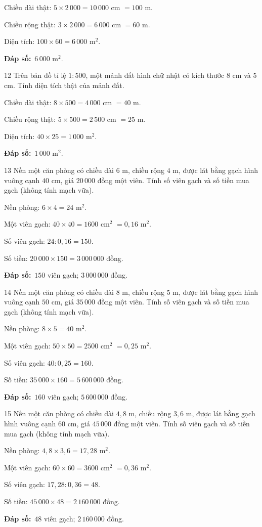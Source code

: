 \documentclass[11pt]{article}
\newif\ifsol \solfalse
\providecommand{\AnsWord}{Đáp số}
\newcommand{\dapso}[1]{\par\textbf{\AnsWord:}\ #1}
\newcommand{\probsol}[1]{%
  \begin{lrbox}{\solmeasure}\begin{minipage}{\dimexpr\linewidth-24pt\relax}#1\end{minipage}\end{lrbox}%
  \ifsol
    \begin{solbox}#1\end{solbox}%
  \else
    \setlength{\solht}{\dimexpr\ht\solmeasure+\dp\solmeasure+0.85cm\relax}%
    \ifdim\solht<1.35cm\setlength{\solht}{1.35cm}\fi
    \begin{tcolorbox}[colback=white,colframe=Line,boxrule=0.8pt,arc=5pt,
      left=8pt,right=8pt,top=4pt,bottom=4pt,height=\solht]{\footnotesize\color{Slate}\itshape\WorkWord}\end{tcolorbox}%
  \fi}
\newcommand{\gap}{\vspace{0.3cm}}
\def\WorkWord{Bài làm:}
\def\AnsWord{Đáp số}
\begin{document}
\probsol{
Chiều dài thật: $5\times2\,000=10\,000$ cm $=100$ m.\par Chiều rộng thật: $3\times2\,000=6\,000$ cm $=60$ m.\par Diện tích: $100\times60=6\,000$ m$^2$.
\dapso{$6\,000$ m$^2$.}}
\gap
\begin{probbox}{12}{\relax}
Trên bản đồ tỉ lệ $1:500$, một mảnh đất hình chữ nhật có kích thước $8$ cm và $5$ cm. Tính diện tích thật của mảnh đất.
\end{probbox}
\probsol{
Chiều dài thật: $8\times500=4\,000$ cm $=40$ m.\par Chiều rộng thật: $5\times500=2\,500$ cm $=25$ m.\par Diện tích: $40\times25=1\,000$ m$^2$.
\dapso{$1\,000$ m$^2$.}}
\gap
\begin{probbox}{13}{\relax}
Nền một căn phòng có chiều dài $6$ m, chiều rộng $4$ m, được lát bằng gạch hình vuông cạnh $40$ cm, giá $20\,000$ đồng một viên. Tính số viên gạch và số tiền mua gạch (không tính mạch vữa).
\end{probbox}
\probsol{
Nền phòng: $6\times4=24$ m$^2$.\par Một viên gạch: $40\times40=1600$ cm$^2$ $=0{,}16$ m$^2$.\par Số viên gạch: $24:0{,}16=150$.\par Số tiền: $20\,000\times150=3\,000\,000$ đồng.
\dapso{$150$ viên gạch; $3\,000\,000$ đồng.}}
\gap
\begin{probbox}{14}{\relax}
Nền một căn phòng có chiều dài $8$ m, chiều rộng $5$ m, được lát bằng gạch hình vuông cạnh $50$ cm, giá $35\,000$ đồng một viên. Tính số viên gạch và số tiền mua gạch (không tính mạch vữa).
\end{probbox}
\probsol{
Nền phòng: $8\times5=40$ m$^2$.\par Một viên gạch: $50\times50=2500$ cm$^2$ $=0{,}25$ m$^2$.\par Số viên gạch: $40:0{,}25=160$.\par Số tiền: $35\,000\times160=5\,600\,000$ đồng.
\dapso{$160$ viên gạch; $5\,600\,000$ đồng.}}
\gap
\begin{probbox}{15}{\relax}
Nền một căn phòng có chiều dài $4{,}8$ m, chiều rộng $3{,}6$ m, được lát bằng gạch hình vuông cạnh $60$ cm, giá $45\,000$ đồng một viên. Tính số viên gạch và số tiền mua gạch (không tính mạch vữa).
\end{probbox}
\probsol{
Nền phòng: $4{,}8\times3{,}6=17{,}28$ m$^2$.\par Một viên gạch: $60\times60=3600$ cm$^2$ $=0{,}36$ m$^2$.\par Số viên gạch: $17{,}28:0{,}36=48$.\par Số tiền: $45\,000\times48=2\,160\,000$ đồng.
\dapso{$48$ viên gạch; $2\,160\,000$ đồng.}}
\end{document}
